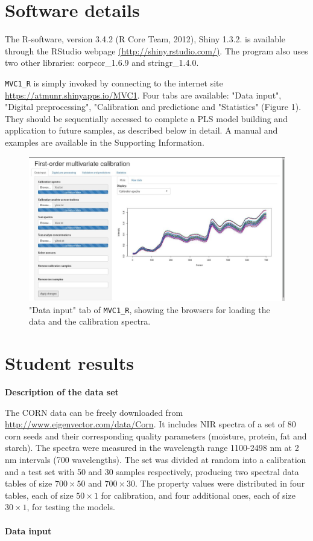 \documentclass[10pt,twocolumn]{article}
\begin{document}
\section*{Software details}

The R-software, version 3.4.2 (R Core Team, 2012), Shiny 1.3.2. is available
through the RStudio webpage \url{(http://shiny.rstudio.com/)}. The program
also uses two other libraries: corpcor\_1.6.9 and stringr\_1.4.0.

\texttt{MVC1\_R} is simply invoked by connecting to the internet site
\url{https://atmunr.shinyapps.io/MVC1}. Four tabs are available: "Data
input", "Digital preprocessing", "Calibration and predictione and "Statistics"
(Figure 1). They should be sequentially accessed to complete a PLS model
building and application to future samples, as described below in detail.
A manual and examples are available in the Supporting Information.

\begin{figure}[h!]
	\includegraphics[width=\linewidth]{figure1.jpg}
	\caption{"Data input" tab of \texttt{MVC1\_R}, showing the browsers for
	loading the data and the calibration spectra.}
	\label{fig:1}
\end{figure}	

\section*{Student results}

\textbf{Description of the data set}

The CORN data can be freely downloaded from
\url{http://www.eigenvector.com/data/Corn}. It includes NIR spectra of a set
of 80 corn seeds and their corresponding quality parameters (moisture, protein,
fat and starch). The spectra were measured in the wavelength range 1100-2498 nm
at 2 nm intervals (700 wavelengths). The set was divided at random into a
calibration and a test set with 50 and 30 samples respectively, producing two
spectral data tables of size $700\times50$ and $700\times30$. The property
values were distributed in four tables, each of size $50\times1$ for
calibration, and four additional ones, each of size $30\times1$, for testing the
models.
\\ \\
\textbf{Data input}
\end{document}
